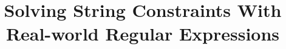 \documentclass{llncs}
\begin{document}
\title{Solving String Constraints With \\
Real-world Regular Expressions}



\author{}
\institute{}

\maketitle


\end{document}
